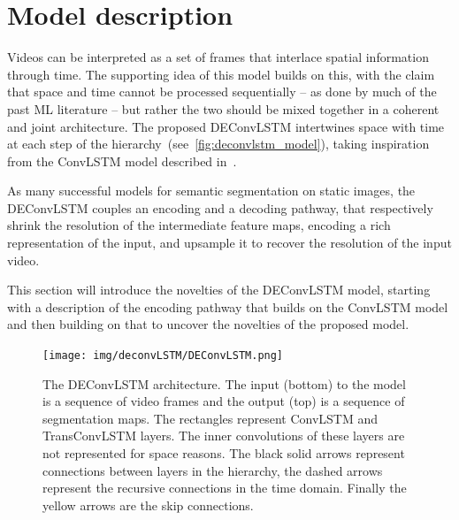 

\section{Model description}\label{sec:deconvlstm_model}

Videos can be interpreted as a set of frames that interlace spatial information
through time. The supporting idea of this model builds on this, with the claim
that space and time cannot be processed sequentially -- as done by much of the
past ML literature -- but rather the two should be mixed together in a coherent
and joint architecture. The proposed DEConvLSTM intertwines space with time at
each step of the hierarchy~(see~\autoref{fig:deconvlstm_model}), taking
inspiration from the ConvLSTM model described in~\cite{ShiCWYWW15}.

As many successful models for semantic segmentation on static images, the
DEConvLSTM couples an encoding and a decoding pathway, that respectively shrink
the resolution of the intermediate feature maps, encoding a rich representation
of the input, and upsample it to recover the resolution of the input video.

This section will introduce the novelties of the DEConvLSTM model, starting
with a description of the encoding pathway that builds on the ConvLSTM model
and then building on that to uncover the novelties of the proposed model.

\begin{figure}[t]
    \centering
    \texttt{[image: img/deconvLSTM/DEConvLSTM.png]}
    \caption{The DEConvLSTM architecture. The input (bottom) to the model is a
        sequence of video frames and the output (top) is a sequence of
        segmentation maps. The rectangles represent ConvLSTM and TransConvLSTM
        layers. The inner convolutions of these layers are not represented for
        space reasons. The black solid arrows represent connections between
        layers in the hierarchy, the dashed arrows represent the recursive
        connections in the time domain. Finally the yellow arrows are the skip
        connections.}\label{fig:deconvlstm_model}
\end{figure}


